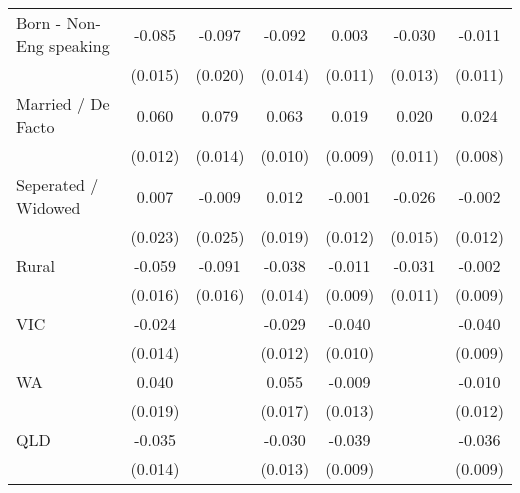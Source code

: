 {\begin{tabular}{l*{6}{c}}
Born - Non-Eng speaking&      -0.085\sym{***}&      -0.097\sym{***}&      -0.092\sym{***}&       0.003         &      -0.030\sym{**} &      -0.011         \\
                    &     (0.015)         &     (0.020)         &     (0.014)         &     (0.011)         &     (0.013)         &     (0.011)         \\
Married / De Facto  &       0.060\sym{***}&       0.079\sym{***}&       0.063\sym{***}&       0.019\sym{**} &       0.020\sym{*}  &       0.024\sym{***}\\
                    &     (0.012)         &     (0.014)         &     (0.010)         &     (0.009)         &     (0.011)         &     (0.008)         \\
Seperated / Widowed &       0.007         &      -0.009         &       0.012         &      -0.001         &      -0.026\sym{*}  &      -0.002         \\
                    &     (0.023)         &     (0.025)         &     (0.019)         &     (0.012)         &     (0.015)         &     (0.012)         \\
Rural               &      -0.059\sym{***}&      -0.091\sym{***}&      -0.038\sym{***}&      -0.011         &      -0.031\sym{***}&      -0.002         \\
                    &     (0.016)         &     (0.016)         &     (0.014)         &     (0.009)         &     (0.011)         &     (0.009)         \\
VIC                 &      -0.024\sym{*}  &                     &      -0.029\sym{**} &      -0.040\sym{***}&                     &      -0.040\sym{***}\\
                    &     (0.014)         &                     &     (0.012)         &     (0.010)         &                     &     (0.009)         \\
WA                  &       0.040\sym{**} &                     &       0.055\sym{***}&      -0.009         &                     &      -0.010         \\
                    &     (0.019)         &                     &     (0.017)         &     (0.013)         &                     &     (0.012)         \\
QLD                 &      -0.035\sym{**} &                     &      -0.030\sym{**} &      -0.039\sym{***}&                     &      -0.036\sym{***}\\
                    &     (0.014)         &                     &     (0.013)         &     (0.009)         &                     &     (0.009)         \\

\end{tabular}}
